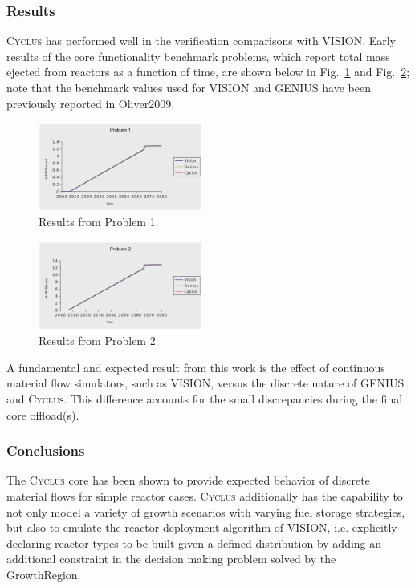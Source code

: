 \documentclass{anstrans}
\begin{document}
\subsubsection{Results}
\textsc{Cyclus} has performed well in the verification comparisons with VISION.
Early results of the core functionality benchmark problems, which report total mass 
ejected from reactors as a function of time, are shown below in Fig.~\ref{fig:p1} 
and Fig.~\ref{fig:p2}; note that the benchmark values used for VISION and GENIUS have 
been previously reported in Oliver2009\cite{oliver2009}.
\begin{figure}[ht]
  \centering
  \includegraphics[width=0.48\textwidth]{p1.ps}
  \caption{Results from Problem 1.}
  \label{fig:p1}
\end{figure}
\begin{figure}[ht]
  \centering
  \includegraphics[width=0.48\textwidth]{p2.ps}
  \caption{Results from Problem 2.}
  \label{fig:p2}
\end{figure}

A fundamental and expected result from this work is the effect of continuous
material flow simulators, such as VISION, versus the discrete nature of 
GENIUS and \textsc{Cyclus}. This difference accounts for the small discrepancies
during the final core offload(s)\cite{oliver2009}.

\subsubsection{Conclusions}
The \textsc{Cyclus} core has been shown to provide expected behavior of discrete 
material flows for simple reactor cases. \textsc{Cyclus} additionally has the 
capability to not only model a variety of growth scenarios with varying fuel storage 
strategies, but also to emulate the reactor deployment algorithm of VISION, i.e. 
explicitly declaring reactor types to be built given a defined distribution by adding 
an additional constraint in the decision making problem solved by the GrowthRegion.
\end{document}
